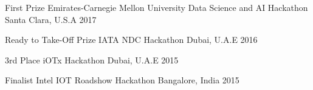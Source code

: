 



\begin{cvhonors}

  \cvhonor
    {First Prize} %
    {Emirates-Carnegie Mellon University Data Science and AI Hackathon} %
    {Santa Clara, U.S.A} %
    {2017} %

  \cvhonor
    {Ready to Take-Off Prize} %
    {IATA NDC Hackathon} %
    {Dubai, U.A.E} %
    {2016} %

  \cvhonor
    {3rd Place} %
    {iOTx Hackathon} %
    {Dubai, U.A.E} %
    {2015} %

  \cvhonor
    {Finalist} %
    {Intel IOT Roadshow Hackathon} %
    {Bangalore, India} %
    {2015} %

\end{cvhonors}

